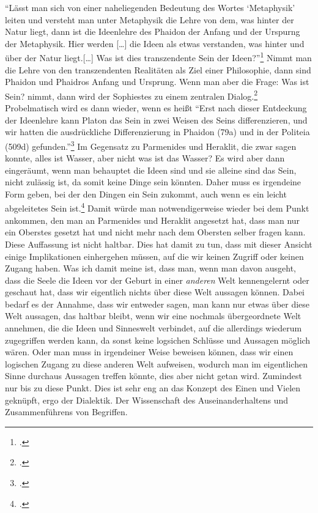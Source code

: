 \enquote{Lässt man sich von einer naheliegenden Bedeutung des Wortes \enquote{Metaphysik} leiten und versteht man unter Metaphysik die Lehre von dem, was hinter der Natur liegt, dann ist die Ideenlehre des Phaidon der Anfang und der Urspurng der Metaphysik. Hier werden [\dots] die Ideen als etwas verstanden, was hinter und über der Natur liegt.[\dots] Was ist dies transzendente Sein der Ideen?}\footcite[vgl.][S. 128]{Martin73}
Nimmt man die Lehre von den transzendenten Realitäten als Ziel einer Philosophie, dann sind Phaidon und Phaidros Anfang und Ursprung. Wenn man aber die Frage: Was ist Sein? nimmt, dann wird der Sophiestes zu einem zentralen Dialog.\footcite[vgl.][S. 129]{Martin73}
Probelmatisch wird es dann wieder, wenn es heißt \enquote{Erst nach dieser Entdeckung der Ideenlehre kann Platon das Sein in zwei Weisen des Seins differenzieren, und wir hatten die ausdrückliche Differenzierung in Phaidon (79a) und in der Politeia (509d) gefunden.}\footcite[][S. 131f]{Martin73} Im Gegensatz zu Parmenides und Heraklit, die zwar sagen konnte, alles ist Wasser, aber nicht was ist das Wasser?
Es wird aber dann eingeräumt, wenn man behauptet die Ideen sind und sie alleine sind das Sein, nicht zulässig ist, da somit keine Dinge sein könnten. Daher muss es irgendeine Form geben, bei der den Dingen ein Sein zukommt, auch wenn es ein leicht abgeleitetes Sein ist.\footcite[vgl.][S. 131]{Martin73}
Damit würde man notwendigerweise wieder bei dem Punkt ankommen, den man an Parmenides und Heraklit angesetzt hat, dass man nur ein Oberstes gesetzt hat und nicht mehr nach dem Obersten selber fragen kann.  
Diese Auffassung ist nicht haltbar. Dies hat damit zu tun, dass mit dieser Ansicht einige Implikationen einhergehen müssen, auf die wir keinen Zugriff oder keinen Zugang haben. Was ich damit meine ist, dass man, wenn man davon ausgeht, dass die Seele die Ideen vor der Geburt in einer \emph{anderen} Welt kennengelernt oder geschaut hat, dass wir eigentlich nichts über diese Welt aussagen können. Dabei bedarf es der Annahme, dass wir entweder sagen, man kann nur etwas über diese Welt aussagen, das haltbar bleibt, wenn wir eine nochmals übergeordnete Welt annehmen, die die Ideen und Sinneswelt verbindet, auf die allerdings wiederum zugegriffen werden kann, da sonst keine logsichen Schlüsse und Aussagen möglich wären. Oder man muss in irgendeiner Weise beweisen können, dass wir einen logischen Zugang zu diese anderen Welt aufweisen, wodurch man im eigentlichen Sinne durchaus Aussagen treffen könnte, dies aber nicht getan wird. Zumindest nur bis zu diese Punkt.
Dies ist sehr eng an das Konzept des Einen und Vielen geknüpft, ergo der Dialektik. Der Wissenschaft des Auseinanderhaltens und Zusammenführens von Begriffen.

